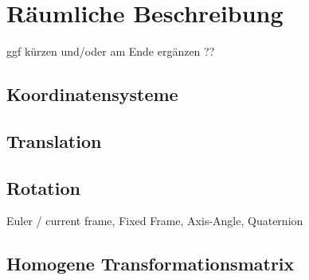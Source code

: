 \cleardoublepage
\chapter{Räumliche Beschreibung}

ggf kürzen und/oder am Ende ergänzen ??

\section{Koordinatensysteme}

\section{Translation}

\section{Rotation}

Euler / current frame,
Fixed Frame,
Axis-Angle,
Quaternion

\section{Homogene Transformationsmatrix}